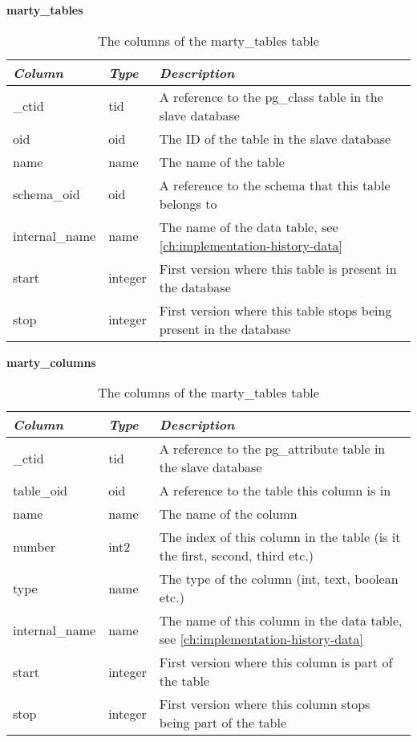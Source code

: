 \begin{table}[h]
  \centering
  \textbf{marty\_tables}
  \begin{tabularx}{\textwidth}{llX}
    \textit{Column} & \textit{Type} & \textit{Description} \\
    \midrule
    \_ctid & tid & A reference to the pg\_class table in the slave database \\
    oid & oid & The ID of the table in the slave database \\
    name & name & The name of the table \\
    schema\_oid & oid & A reference to the schema that this table belongs to \\
    internal\_name & name & The name of the data table, see \ref{ch:implementation-history-data} \\
    start & integer & First version where this table is present in the database \\
    stop & integer & First version where this table stops being present in the database \\
  \end{tabularx}
  \caption{The columns of the marty\_tables table}
  \label{tbl:marty-tables}
\end{table}

\begin{table}[h]
  \centering
  \textbf{marty\_columns}
  \begin{tabularx}{\textwidth}{llX}
    \textit{Column} & \textit{Type} & \textit{Description} \\
    \midrule
    \_ctid & tid & A reference to the pg\_attribute table in the slave database \\
    table\_oid & oid & A reference to the table this column is in \\
    name & name & The name of the column \\
    number & int2 & The index of this column in the table (is it the first, second, third etc.) \\
    type & name & The type of the column (int, text, boolean etc.) \\
    internal\_name & name & The name of this column in the data table, see \ref{ch:implementation-history-data} \\
    start & integer & First version where this column is part of the table \\
    stop & integer & First version where this column stops being part of the table \\
  \end{tabularx}
  \caption{The columns of the marty\_tables table}
  \label{tbl:marty-columns}
\end{table}


